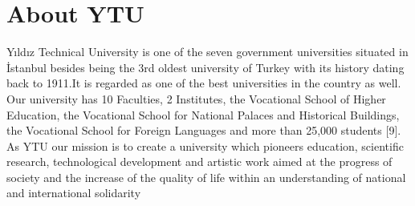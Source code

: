 \section{About YTU}
Yıldız Technical University is one of the seven government universities situated in İstanbul besides being the 3rd oldest university of Turkey with its history dating back to 1911.It is regarded as one of the best universities in the country as well. Our university has 10 Faculties, 2 Institutes, the Vocational School of Higher Education, the Vocational School for National Palaces and Historical Buildings, the Vocational School for Foreign Languages and more than 25,000 students [9]. 
As YTU our mission is to create a university which pioneers education, scientific research, technological development and artistic work aimed at the progress of society and the increase of the quality of life within an understanding of national and international solidarity

